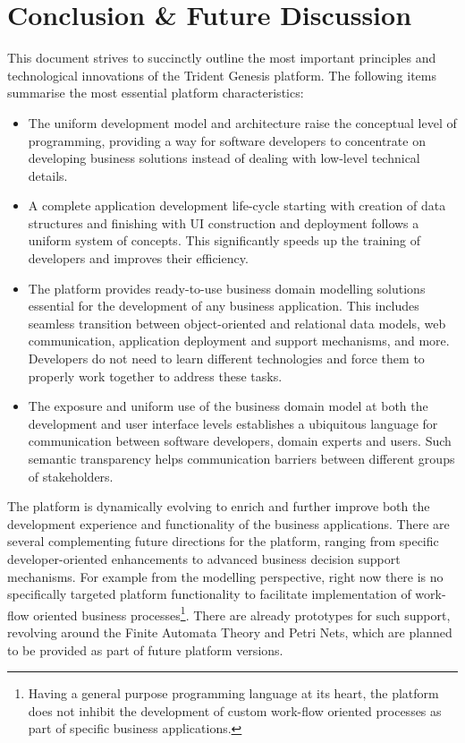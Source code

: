 \section{Conclusion \& Future Discussion}\label{sec:08}

  This document strives to succinctly outline the most important principles and technological innovations of the Trident Genesis platform.
  The following items summarise the most essential platform characteristics: 
  \begin{itemize}
    \item The uniform development model and architecture raise the conceptual level of programming, providing a way for software developers to concentrate on developing business solutions instead of dealing with low-level technical details.
    \item A complete application development life-cycle starting with creation of data structures and finishing with UI construction and deployment follows a uniform system of concepts.
	This significantly speeds up the training of developers and improves their efficiency.
    \item The platform provides ready-to-use business domain modelling solutions essential for the development of any business application.
	  This includes seamless transition between object-oriented and relational data models, web communication, application deployment and support mechanisms, and more.
	  Developers do not need to learn different technologies and force them to properly work together to address these tasks.
    \item The exposure and uniform use of the business domain model at both the development and user interface levels establishes a ubiquitous language for communication between software developers, domain experts and users.
	  Such semantic transparency helps communication barriers between different groups of stakeholders.
  \end{itemize}

  The platform is dynamically evolving to enrich and further improve both the development experience and functionality of the business applications.
  There are several complementing future directions for the platform, ranging from specific developer-oriented enhancements to advanced business decision support mechanisms.
  For example from the modelling perspective, right now there is no specifically targeted platform functionality to facilitate implementation of work-flow oriented business processes\footnote{Having a general purpose programming language at its heart, the platform does not inhibit the development of custom work-flow oriented processes as part of specific business applications.}.
  There are already prototypes for such support, revolving around the Finite Automata Theory and Petri Nets, which are planned to be provided as part of future platform versions.
  
